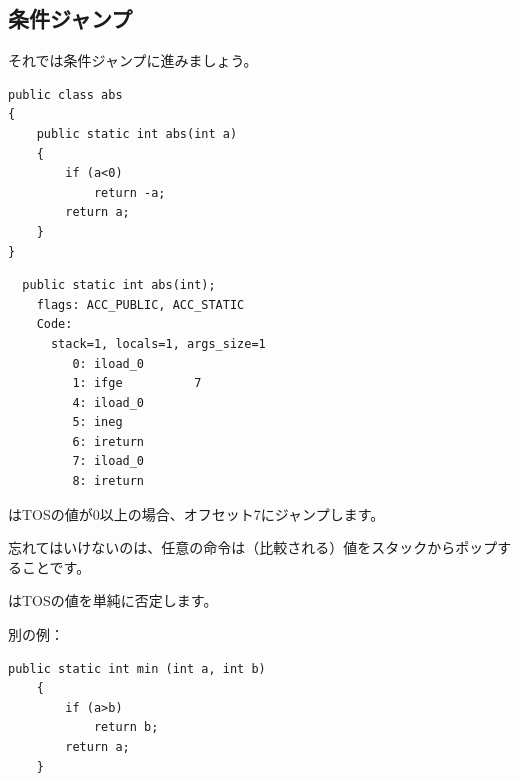 \subsection{条件ジャンプ}

それでは条件ジャンプに進みましょう。

\begin{lstlisting}[style=customjava]
public class abs
{
	public static int abs(int a)
	{
		if (a<0)
			return -a;
		return a;
	}
}
\end{lstlisting}

\begin{lstlisting}
  public static int abs(int);
    flags: ACC_PUBLIC, ACC_STATIC
    Code:
      stack=1, locals=1, args_size=1
         0: iload_0       
         1: ifge          7
         4: iload_0       
         5: ineg          
         6: ireturn       
         7: iload_0       
         8: ireturn       
\end{lstlisting}

は\ac{TOS}の値が0以上の場合、オフセット7にジャンプします。

忘れてはいけないのは、任意の命令は（比較される）値をスタックからポップすることです。

は\ac{TOS}の値を単純に否定します。

別の例：

\begin{lstlisting}[style=customjava]
	public static int min (int a, int b)
	{
		if (a>b)
			return b;
		return a;
	}
\end{lstlisting}